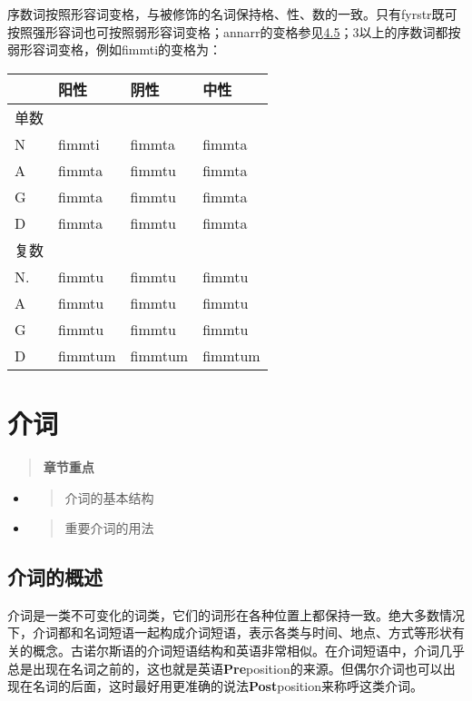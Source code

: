 序数词按照形容词变格，与被修饰的名词保持格、性、数的一致。只有fyrstr既可按照强形容词也可按照弱形容词变格；annarr的变格参见\hyperref[ux4e0dux89c4ux5219ux5f62ux5bb9ux8bcd]{4.5}；3以上的序数词都按弱形容词变格，例如fimmti的变格为：

\begin{longtable}{llll}
\toprule
 & 阳性 & 阴性 & 中性 \\
\midrule
\endhead
\bottomrule
\endfoot
单数 & & & \\
N & fimmti & fimmta & fimmta \\
A & fimmta & fimmtu & fimmta \\
G & fimmta & fimmtu & fimmta \\
D & fimmta & fimmtu & fimmta \\
复数 & & & \\
N. & fimmtu & fimmtu & fimmtu \\
A & fimmtu & fimmtu & fimmtu \\
G & fimmtu & fimmtu & fimmtu \\
D & fimmtum & fimmtum & fimmtum \\
\end{longtable}

\section{介词}\label{ux4ecbux8bcd}

\begin{quote}
\textbf{章节重点}
\end{quote}

\begin{itemize}
\item
  \begin{quote}
  介词的基本结构
  \end{quote}
\item
  \begin{quote}
  重要介词的用法
  \end{quote}
\end{itemize}

\subsection{介词的概述}\label{ux4ecbux8bcdux7684ux6982ux8ff0}

介词是一类不可变化的词类，它们的词形在各种位置上都保持一致。绝大多数情况下，介词都和名词短语一起构成介词短语，表示各类与时间、地点、方式等形状有关的概念。古诺尔斯语的介词短语结构和英语非常相似。在介词短语中，介词几乎总是出现在名词之前的，这也就是英语\textbf{Pre}position的来源。但偶尔介词也可以出现在名词的后面，这时最好用更准确的说法\textbf{Post}position来称呼这类介词。

